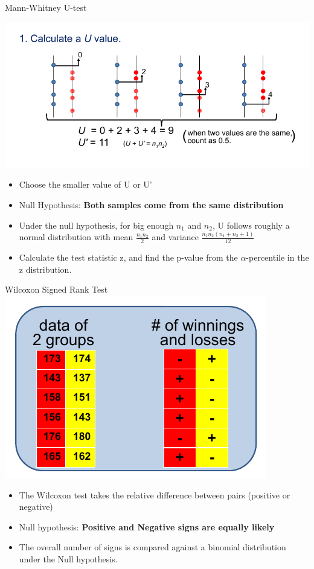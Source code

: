 \begin{frame}{Mann-Whitney U-test}{}
  \begin{center}
    \includegraphics[width=.6\textwidth]{../img/MannWhitneyU}
  \end{center}

  \begin{itemize}
    \item Choose the smaller value of U or U'
    \item Null Hypothesis: {\bf Both samples come from the same distribution}
    \item Under the null hypothesis, for big enough $n_1$ and $n_2$, U follows
    roughly a normal distribution with mean $\frac{n_1n_2}{2}$ and variance $\frac{n_1n_2(n_1+n_2+1)}{12}$
    \item Calculate the test statistic z, and find the p-value from the $\alpha$-percentile in the z distribution.
  \end{itemize}
\end{frame}

\begin{frame}{Wilcoxon Signed Rank Test}{}
  \includegraphics[width=.4\textwidth]{../img/SignTest}

  \begin{itemize}
    \item The Wilcoxon test takes the relative difference between pairs (positive or negative)
    \item Null hypothesis: {\bf Positive and Negative signs are equally likely}
    \item The overall number of signs is compared against a binomial distribution under the Null hypothesis.
  \end{itemize}
\end{frame}


